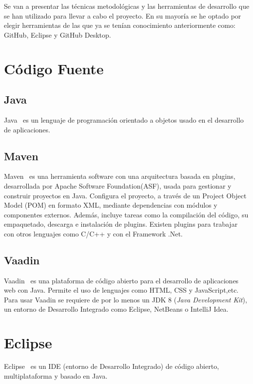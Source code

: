 
Se van a presentar las técnicas metodológicas y las herramientas de desarrollo que se han utilizado para llevar a cabo el proyecto. En su mayoría se he optado por elegir herramientas de las que ya se tenían conocimiento anteriormente como: GitHub, Eclipse y GitHub Desktop.

\section{Código Fuente}

\subsection{Java}
Java~\cite{pagina_java} es un lenguaje de programación orientado a objetos usado en el desarrollo de aplicaciones.

\subsection{Maven}
Maven~\cite{pagina_maven} es una herramienta software con una arquitectura basada en plugins, desarrollada por Apache Software Foundation(ASF), usada para gestionar y construir proyectos en Java. Configura el proyecto, a través de un Project Object Model (POM) en formato XML, mediante dependencias con módulos y componentes externos. Además, incluye tareas como la compilación del código, su empaquetado, descarga e instalación de plugins. Existen plugins para trabajar con otros lenguajes como C/C++ y con el Framework .Net. 

\subsection{Vaadin}
Vaadin~\cite{pagina_vaadin} es una plataforma de código abierto para el desarrollo de aplicaciones web con Java. Permite el uso de lenguajes como HTML, CSS y JavaScript,etc.
Para usar Vaadin se requiere de por lo menos un JDK 8 (\textit{Java Development Kit}), un entorno de Desarrollo Integrado como Eclipse, NetBeans o IntelliJ Idea. 

\section{Eclipse}
Eclipse~\cite{pagina_eclipse} es un IDE (entorno de Desarrollo Integrado) de código abierto, multiplataforma y basado en Java. 

